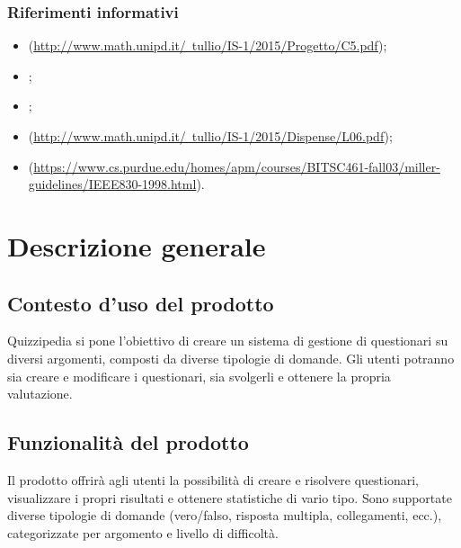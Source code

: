 \documentclass[a4paper, titlepage]{article}
\begin{document}
\subsubsection{Riferimenti informativi}
\begin{itemize}
\item {}  (\href{http://www.math.unipd.it/~tullio/IS-1/2015/Progetto/C5.pdf}{http://www.math.unipd.it/~tullio/IS-1/2015/Progetto/C5.pdf});

\item {} ;

\item {} ;

\item {}  (\href{http://www.math.unipd.it/~tullio/IS-1/2015/Dispense/L06.pdf}{http://www.math.unipd.it/~tullio/IS-1/2015/Dispense/L06.pdf});

\item {}  (\href{https://www.cs.purdue.edu/homes/apm/courses/BITSC461-fall03/miller-guidelines/IEEE830-1998.html}{https://www.cs.purdue.edu/homes/apm/courses/BITSC461-fall03/miller-guidelines/IEEE830-1998.html}).

\end{itemize}

\newpage

\section{Descrizione generale}
\subsection{Contesto d'uso del prodotto}
Quizzipedia si pone l'obiettivo di creare un sistema di gestione di questionari su diversi argomenti, composti da diverse tipologie di domande. Gli utenti potranno sia creare e modificare i questionari, sia svolgerli e ottenere la propria valutazione.

\subsection{Funzionalità del prodotto}
Il prodotto offrirà agli utenti la possibilità di creare e risolvere questionari, visualizzare i propri risultati e ottenere statistiche di vario tipo. 
Sono supportate diverse tipologie di domande (vero/falso, risposta multipla, collegamenti, ecc.), categorizzate per argomento e livello di difficoltà. 
\end{document}
